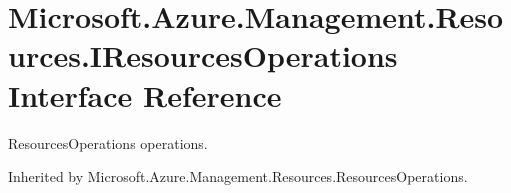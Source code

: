 \hypertarget{interface_microsoft_1_1_azure_1_1_management_1_1_resources_1_1_i_resources_operations}{}\section{Microsoft.\+Azure.\+Management.\+Resources.\+I\+Resources\+Operations Interface Reference}
\label{interface_microsoft_1_1_azure_1_1_management_1_1_resources_1_1_i_resources_operations}


Resources\+Operations operations.  




Inherited by Microsoft.\+Azure.\+Management.\+Resources.\+Resources\+Operations.

